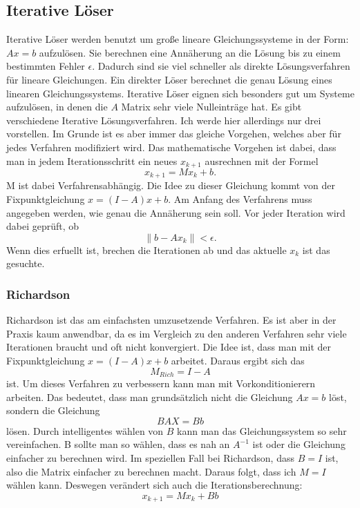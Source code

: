 \documentclass[a4paper, 11pt]{article}
\begin{document}
    		\subsection{Iterative L\"{o}ser}
    		Iterative L\"{o}ser werden benutzt um gro{\ss}e lineare Gleichungssysteme in der Form: $Ax=b$ aufzul\"{o}sen. Sie berechnen eine Ann\"{a}herung an die L\"{o}sung bis zu einem bestimmten Fehler $\epsilon$. Dadurch sind sie viel schneller als direkte L\"{o}sungsverfahren f\"{u}r lineare Gleichungen. Ein direkter L\"{o}ser berechnet die genau L\"{o}sung eines linearen Gleichungssystems. Iterative L\"{o}ser eignen sich besonders gut um Systeme aufzul\"{o}sen, in denen die $A$ Matrix sehr viele Nulleintr\"{a}ge hat. 
    		\newline Es gibt verschiedene Iterative L\"{o}sungsverfahren. Ich werde hier allerdings nur drei vorstellen. Im Grunde ist es aber immer das gleiche Vorgehen, welches aber f\"{u}r jedes Verfahren modifiziert wird. Das mathematische Vorgehen ist dabei, dass man in jedem Iterationsschritt ein neues $x_{k+1}$ ausrechnen mit der Formel $$x_{k+1}=Mx_{k}+b.$$ M ist dabei Verfahrensabh\"{a}ngig. Die Idee zu dieser Gleichung kommt von der Fixpunktgleichung $x=(I-A)x+b$.
    		\newline Am Anfang des Verfahrens muss angegeben werden, wie genau die Ann\"{a}herung sein soll. Vor jeder Iteration wird dabei gepr\"{u}ft, ob $$\left\|b-Ax_{k}\right\|<\epsilon.$$ Wenn dies erfuellt ist, brechen die Iterationen ab und das aktuelle $x_{k}$ ist das gesuchte.
    			\subsubsection{Richardson}
    			Richardson ist das am einfachsten umzusetzende Verfahren. Es ist aber in der Praxis kaum anwendbar, da es im Vergleich zu den anderen Verfahren sehr viele Iterationen braucht und oft nicht konvergiert. Die Idee ist, dass man mit der Fixpunktgleichung $x=(I-A)x+b$ arbeitet. Daraus ergibt sich das $$M_{Rich}=I-A$$ ist. Um dieses Verfahren zu verbessern kann man mit Vorkonditionierern arbeiten. Das bedeutet, dass man grunds\"{a}tzlich nicht die Gleichung $Ax=b$ l\"{o}st, sondern die Gleichung $$BAX=Bb$$ l\"{o}sen. Durch intelligentes w\"{a}hlen von $B$ kann man das Gleichungssystem so sehr vereinfachen. B sollte man so w\"ahlen, dass es nah an $A^{-1}$ ist oder die Gleichung einfacher zu berechnen wird. Im speziellen Fall bei Richardson, dass $B=I$ ist, also die Matrix einfacher zu berechnen macht. Daraus folgt, dass ich $M=I$ w\"{a}hlen kann. Deswegen ver\"{a}ndert sich auch die Iterationsberechnung: $$x_{k+1}=Mx_{k}+Bb$$
\end{document}
